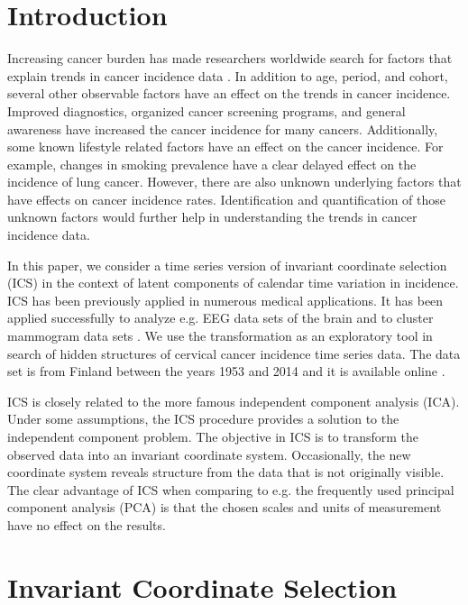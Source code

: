 \documentclass{llncs}
\begin{document}
\section{Introduction}\label{intro}
Increasing cancer burden has made researchers worldwide search for factors that explain  trends in cancer incidence data \citep{parkin2011}. In addition to age, period, and cohort, several other observable factors have an effect on the trends in cancer incidence. Improved diagnostics, organized cancer screening programs, and general awareness have increased the  cancer incidence for many cancers. Additionally, some known lifestyle related factors have an effect on the cancer incidence. For example, changes in smoking prevalence have a clear delayed effect on the incidence of lung cancer. However, there are also unknown underlying factors that have effects on cancer incidence rates. Identification and quantification of those unknown factors would further help in understanding the trends in cancer incidence data.

In this paper, we consider a time series version of invariant coordinate selection (ICS) in the context of latent components of calendar time variation in incidence. ICS has been previously applied in numerous medical applications. It has been applied successfully to analyze e.g. EEG data sets of the brain \cite{joyce2004} and to cluster mammogram data sets \cite{gallardo2012}.
We use the transformation as an exploratory tool in search of hidden structures of cervical cancer incidence time
series data. The data set is from Finland between the years 1953 and 2014 and it is available online \cite{engholm2010}.

ICS is closely related to the more famous independent component analysis (ICA). Under some assumptions, the ICS procedure provides a solution to the independent component problem. The objective in ICS is to transform the observed data into an invariant coordinate system. Occasionally,  the new coordinate system reveals structure from the data that is not originally visible. The clear advantage of ICS when comparing to e.g. the frequently used principal component analysis (PCA) is that the chosen scales and units of measurement have no effect on the results. 





\section{Invariant Coordinate Selection}\label{secpca}
\end{document}
